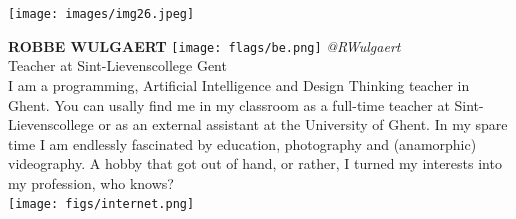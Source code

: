 \documentclass[11pt]{article}
\begin{document}
\noindent
\begin{minipage}{0.3\textwidth}
\centering
\texttt{[image: images/img26.jpeg]}
\end{minipage}
\hfill
\begin{minipage}{0.6\textwidth}\raggedright
\color{color1}\uppercase{\textbf{Robbe Wulgaert}}
\color{color2}\hspace{0.2cm}\texttt{[image: flags/be.png]}
\hspace{0.2cm}\textit{@RWulgaert}
\\
Teacher at Sint-Lievenscollege Gent\\
{\footnotesize I am a programming, Artificial Intelligence and Design Thinking teacher in Ghent. You can usally find me in my classroom as a full-time teacher at Sint-Lievenscollege or as an external assistant at the University of Ghent. In my spare time I am endlessly fascinated by education, photography and (anamorphic) videography. A hobby that got out of hand, or rather, I turned my interests into my profession, who knows?}\\
\texttt{[image: figs/internet.png]}
\end{minipage}
\newline\newline\newline
\end{document}
